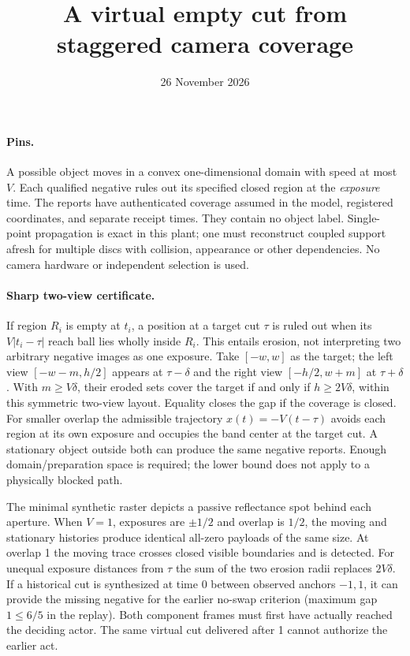 \documentclass{article}
\title{A virtual empty cut from staggered camera coverage}
\author{}
\date{26 November 2026}
\begin{document}
\maketitle

\paragraph{Pins.}
A possible object moves in a convex one-dimensional domain with speed
at most $V$. Each qualified negative rules out its specified closed
region at the \emph{exposure} time. The reports have authenticated
coverage assumed in the model, registered coordinates, and separate
receipt times. They contain no object label. Single-point propagation
is exact in this plant; one must reconstruct coupled support afresh for
multiple discs with collision, appearance or other dependencies.
No camera hardware or independent selection is used.

\paragraph{Sharp two-view certificate.}
If region $R_i$ is empty at $t_i$, a position at a target cut $\tau$
is ruled out when its $V|t_i-\tau|$ reach ball lies wholly inside $R_i$.
This entails erosion, not interpreting two arbitrary negative images
as one exposure. Take $[-w,w]$ as the target; the left view
$[-w-m,h/2]$ appears at $\tau-\delta$ and the right view
$[-h/2,w+m]$ at $\tau+\delta$. With $m\ge V\delta$, their eroded
sets cover the target if and only if $h\ge2V\delta$, within this
symmetric two-view layout. Equality closes the gap if the coverage is
closed. For smaller overlap the admissible trajectory
$x(t)=-V(t-\tau)$ avoids each region at its own exposure and occupies
the band center at the target cut. A stationary object outside both can
produce the same negative reports. Enough domain/preparation space is
required; the lower bound does not apply to a physically blocked path.

The minimal synthetic raster depicts a passive reflectance spot behind
each aperture. When $V=1$, exposures are $\pm1/2$ and overlap is
$1/2$, the moving and stationary histories produce identical all-zero
payloads of the same size. At overlap 1 the moving trace crosses closed
visible boundaries and is detected. For unequal exposure distances
from $\tau$ the sum of the two erosion radii replaces $2V\delta$.
If a historical cut is synthesized at time 0 between observed anchors
$-1,1$, it can provide the missing negative for the earlier no-swap
criterion (maximum gap $1\le 6/5$ in the replay). Both component frames
must first have actually reached the deciding actor. The same virtual
cut delivered after 1 cannot authorize the earlier act.
\end{document}
